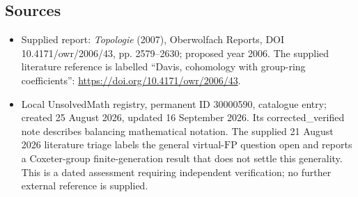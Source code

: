 \documentclass[11pt]{article}
\begin{document}
\subsection{Sources}
\begin{itemize}
\item Supplied report: \emph{Topologie} (2007), Oberwolfach Reports, DOI 10.4171/owr/2006/43, pp. 2579--2630; proposed year 2006. The supplied literature reference is labelled ``Davis, cohomology with group-ring coefficients'': \url{https://doi.org/10.4171/owr/2006/43}.
\item Local UnsolvedMath registry, permanent ID 30000590, catalogue entry; created 25 August 2026, updated 16 September 2026. Its corrected\_verified note describes balancing mathematical notation. The supplied 21 August 2026 literature triage labels the general virtual-$\mathrm{FP}$ question open and reports a Coxeter-group finite-generation result that does not settle this generality. This is a dated assessment requiring independent verification; no further external reference is supplied.
\end{itemize}
\end{document}
